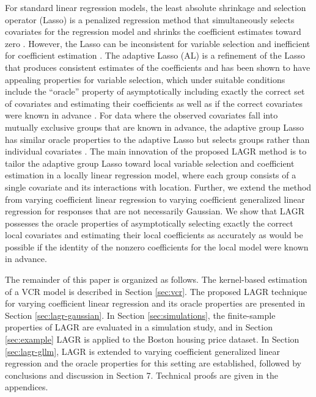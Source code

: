 \documentclass[authoryear,review, 12pt]{elsarticle}
\begin{document}
For standard linear regression models, the least absolute shrinkage
and selection operator (Lasso) is a penalized regression method that
simultaneously selects covariates for the regression model and shrinks
the coefficient estimates toward zero \citep{Tibshirani-1996}. However,
the Lasso can be inconsistent for variable selection and inefficient
for coefficient estimation \citep{Zou-2006}. The adaptive Lasso (AL)
is a refinement of the Lasso that produces consistent estimates of
the coefficients and has been shown to have appealing properties for
variable selection, which under suitable conditions include the ``oracle''
property of asymptotically including exactly the correct set of covariates
and estimating their coefficients as well as if the correct covariates
were known in advance \citep{Zou-2006}. For data where the observed
covariates fall into mutually exclusive groups that are known in advance,
the adaptive group Lasso has similar oracle properties to the adaptive
Lasso but selects groups rather than individual covariates
\citep{Yuan-Lin-2006,Wang-Leng-2008}. The main innovation of the
proposed LAGR method is to tailor the adaptive group Lasso toward
local variable selection and coefficient estimation in a locally linear
regression model, where each group consists of a single covariate
and its interactions with location. Further, we extend the method
from varying coefficient linear regression to varying coefficient
generalized linear regression for responses that are not necessarily
Gaussian. We show that LAGR possesses the oracle properties of asymptotically
selecting exactly the correct local covariates and estimating their
local coefficients as accurately as would be possible if the identity
of the nonzero coefficients for the local model were known in advance.

The remainder of this paper is organized as follows. The kernel-based
estimation of a VCR model is described in Section \ref{sec:vcr}.
The proposed LAGR technique for varying coefficient linear regression
and its oracle properties are presented in Section \ref{sec:lagr-gaussian}.
In Section \ref{sec:simulations}, the finite-sample properties of
LAGR are evaluated in a simulation study, and in Section \ref{sec:example}
LAGR is applied to the Boston housing price dataset. In Section \ref{sec:lagr-gllm},
LAGR is extended to varying coefficient generalized linear regression
and the oracle properties for this setting are established, followed
by conclusions and discussion in Section 7. Technical proofs are given in the appendices.
\end{document}
